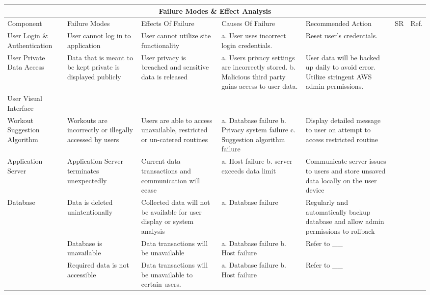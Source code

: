 \documentclass{article}
\begin{document}
	\begin{adjustwidth}{-3cm}{-1cm}
	\centering
	\noindent\begin{tabular}{ |p{3.3cm}||p{2.5cm}|p{3.2cm}|p{2cm}|p{3.3cm}|p{0.7cm}|p{0.7cm}| @{} }
		\hline
		\multicolumn{7}{|c|}{Failure Modes \& Effect Analysis} \\
		\hline
		Component & Failure Modes & Effects Of Failure & Causes Of Failure & Recommended Action & SR & Ref.\\
		\hline
		User Login \& Authentication& User cannot log in to application & User cannot utilize site functionality & 
			a. User uses incorrect login credentials.
			& 
			Reset user's credentials.
			& &\\
		\hline
		User Private Data Access & Data that is meant to be kept private is displayed publicly & 
			User privacy is breached and sensitive data is released & 
				a. Users privacy settings are incorrectly stored.
				\newline
				b. Malicious third party gains access to user data.
			& 
				User data will be backed up daily to avoid error. Utilize stringent AWS admin permissions.
			& &\\
		\hline
		User Visual Interface &  & & & & &\\
		\hline
		Workout Suggestion Algorithm& Workouts are incorrectly or illegally accessed by users& Users are able to access unavailable, restricted or un-catered routines & a. Database failure \newline b. Privacy system failure \newline c. Suggestion algorithm failure & Display detailed message to user on attempt to access restricted routine & &\\
		\hline
		Application Server& Application Server terminates unexpectedly & Current data transactions and communication will cease& a. Host failure \newline b. server exceeds data limit& Communicate server issues to users and store unsaved data locally on the user device & & \\
		\hline
		Database& Data is deleted unintentionally& Collected data will not be available for user display or system analysis& a. Database failure & Regularly and automatically backup database and allow admin permissions to rollback & &\\
		\cline{2-7}
		& Database is unavailable & Data transactions will be unavailable & a. Database failure \newline b. Host failure& Refer to \_\_ & &\\
		\cline{2-7}
		& Required data is not accessible &  Data transactions will be unavailable to certain users. & a. Database failure \newline b. Host failure & Refer to \_\_ & &\\
		\hline
	\end{tabular}
	\end{adjustwidth}
\end{document}
